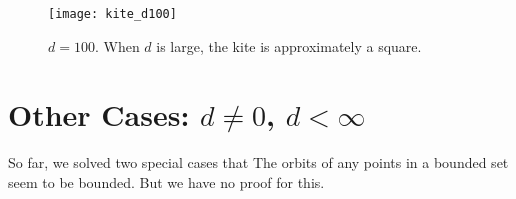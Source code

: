\documentclass[12pt,twoside,draft]{book}
\begin{document}
\begin{figure}[ht]
  \begin{center}
    \texttt{[image: kite\_d100]}
  \caption{$d = 100$. When $d$ is large, the kite is approximately a square.}
  \label{fig:kite-square}
  \end{center}
\end{figure}


\section{Other Cases: $d \neq 0$, $d < \infty$}
So far, we solved two special cases that 
The orbits of any points in a bounded set seem to be bounded.
But we have no proof for this.
 



\printindex
\end{document}
